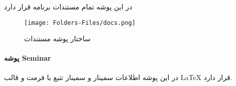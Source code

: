 در این پوشه تمام مستندات برنامه قرار دارد

\begin{figure}[H]
	\texttt{[image: Folders-Files/docs.png]}
	\centering
	\caption{ساختار پوشه مستندات}
	\label{fig:folder-docs}
\end{figure}

\paragraph{پوشه Seminar}
در این پوشه اطلاعات سمینار و سمینار تتبع با فرمت و قالب 
 \LaTeX
 قرار دارد.